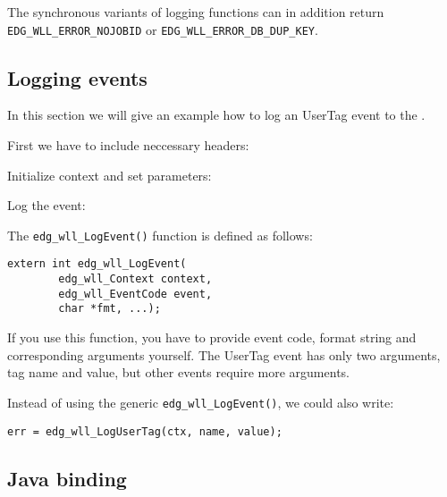 The synchronous variants of logging functions can in addition return
\verb'EDG_WLL_ERROR_NOJOBID' or \verb'EDG_WLL_ERROR_DB_DUP_KEY'.

\subsection{Logging events}
In this section we will give an example how to log an UserTag event to
the \LB.

First we have to include neccessary headers:


Initialize context and set parameters:




Log the event:


The \verb'edg_wll_LogEvent()' function is defined as follows:
\begin{lstlisting}[numbers=none]
extern int edg_wll_LogEvent(
        edg_wll_Context context,
        edg_wll_EventCode event,
        char *fmt, ...);
\end{lstlisting}
If you use this function, you have to provide event code, format
string and corresponding arguments yourself. The UserTag event has
only two arguments, tag name and value, but other events require more
arguments. 

Instead of using the generic \verb'edg_wll_LogEvent()', we could also
write:
\begin{lstlisting}[firstnumber=92]
err = edg_wll_LogUserTag(ctx, name, value);
\end{lstlisting}

\subsection{Java binding}
